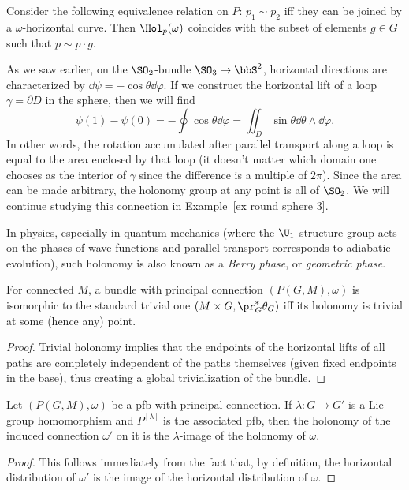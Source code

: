 \begin{rem}\label{rem 1.7.7 RS2}
    Consider the following equivalence relation on $P$: $p_1\sim p_2$ iff they can be joined by a $\omega$-horizontal curve. Then $\Hol_p(\omega)$ coincides with the subset of elements $g\in G$ such that $p\sim p\cdot g$.
\end{rem}

\begin{example}\label{ex round sphere 2}
    As we saw earlier, on the $\SO_2$-bundle $\SO_3\to \bbS^2$, horizontal directions are characterized by $\dd\psi=-\cos\theta\dd\varphi$. If we construct the horizontal lift of a loop $\gamma=\partial D$ in the sphere, then we will find 
    \[\psi(1)-\psi(0)=-\oint\cos\theta\dd\varphi=\iint_D \sin\theta\dd\theta\wedge\dd\varphi.\] 
    In other words, the rotation accumulated after parallel transport along a loop is equal to the area enclosed by that loop (it doesn't matter which domain one chooses as the interior of $\gamma$ since the difference is a multiple of $2\pi$). Since the area can be made arbitrary, the holonomy group at any point is all of $\SO_2$. We will continue studying this connection in Example~\ref{ex round sphere 3}.
    
    In physics, especially in quantum mechanics (where the $\U_1$ structure group acts on the phases of wave functions and parallel transport corresponds to adiabatic evolution), such holonomy is also known as a \emph{Berry phase}, or \emph{geometric phase}. 
\end{example}


\begin{lem}
    For connected $M$, a bundle with principal connection $(P(G,M),\omega)$ is isomorphic to the standard trivial one $(M\times G,\pr_G^\ast\theta_G)$ iff its holonomy is trivial at some (hence any) point.
\end{lem}
\begin{proof}
    Trivial holonomy implies that the endpoints of the horizontal lifts of all paths are completely independent of the paths themselves (given fixed endpoints in the base), thus creating a global trivialization of the bundle.
\end{proof}

\begin{lem}\label{thm 16.6 McKay}
    Let $(P(G,M),\omega)$ be a \gls{pfb} with principal connection. If $\lambda:G\to G'$ is a Lie group homomorphism and $P^{[\lambda]}$ is the associated \gls{pfb}, then the holonomy of the induced connection $\omega'$ on it is the $\lambda$-image of the holonomy of $\omega$.
\end{lem}
\begin{proof}
    This follows immediately from the fact that, by definition, the horizontal distribution of $\omega'$ is the image of the horizontal distribution of $\omega$.
\end{proof}

